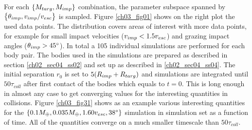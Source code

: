 For each $\{ M_{targ}, M_{imp} \}$ combination, the parameter subspace spanned by $\big\{ \theta_{imp}, v_{imp} / v_{esc} \big\}$ is sampled. Figure \ref{ch03_fig01} shows on the right plot the used data points. The distribution covers areas of interest with more data points, for example for small impact velocities ($v_{imp} < 1.5 v_{esc}$) and grazing impact angles ($\theta_{imp} > 45 ^\circ$). In total a 105 individual simulations are performed for each body pair. The bodies used in the simulations are prepared as described in section \ref{ch02_sec04_ss02} and set up as described in \ref{ch02_sec04_ss04}. The initial separation $r_0$ is set to $5 (R_{imp} + R_{targ})$ and simulations are integrated until $50 \tau_{coll}$ after first contact of the bodies which equals to $t = 0$. This is long enough in almost any case to get converging values for the interesting quantities in collisions. Figure \ref{ch03_fig31} shows as an example various interesting quantities for the $\{0.1 M_{\oplus}, 0.035 M_{\oplus}, 1.60 v_{esc}, 38 ^\circ \}$ simulation in simulation set \css as a function of time. All of the quantities converge on a much smaller timescale than $50 \tau_{coll}$.
